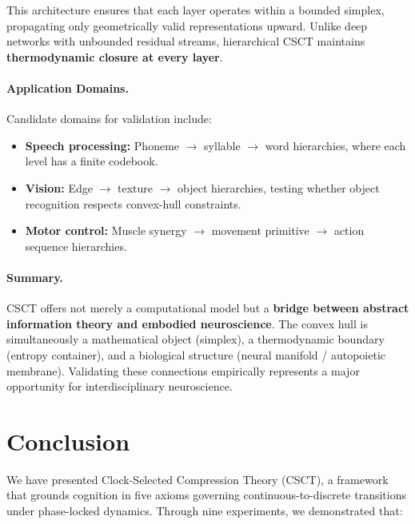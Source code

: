 \documentclass{article}
\begin{document}
This architecture ensures that each layer operates within a bounded simplex, propagating only geometrically valid representations upward.
Unlike deep networks with unbounded residual streams, hierarchical CSCT maintains \textbf{thermodynamic closure at every layer}.

\paragraph{Application Domains.}
Candidate domains for validation include:
\begin{itemize}
    \item \textbf{Speech processing:} Phoneme $\to$ syllable $\to$ word hierarchies, where each level has a finite codebook.
    \item \textbf{Vision:} Edge $\to$ texture $\to$ object hierarchies, testing whether object recognition respects convex-hull constraints.
    \item \textbf{Motor control:} Muscle synergy $\to$ movement primitive $\to$ action sequence hierarchies.
\end{itemize}

\paragraph{Summary.}
CSCT offers not merely a computational model but a \textbf{bridge between abstract information theory and embodied neuroscience}.
The convex hull is simultaneously a mathematical object (simplex), a thermodynamic boundary (entropy container), and a biological structure (neural manifold / autopoietic membrane).
Validating these connections empirically represents a major opportunity for interdisciplinary neuroscience.

\section{Conclusion}

We have presented Clock-Selected Compression Theory (CSCT), a framework that grounds cognition in five axioms governing continuous-to-discrete transitions under phase-locked dynamics.
Through nine experiments, we demonstrated that:
\end{document}
